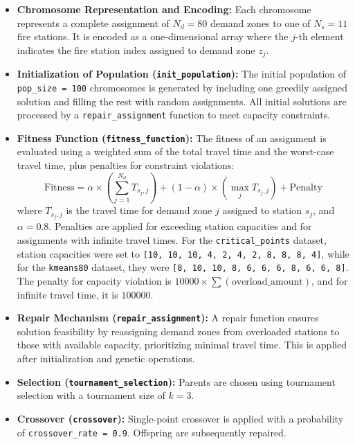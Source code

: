 \documentclass[conference]{IEEEtran}
\begin{document}
\begin{itemize}
    \item \textbf{Chromosome Representation and Encoding:} Each chromosome represents a complete assignment of $N_d=80$ demand zones to one of $N_s=11$ fire stations. It is encoded as a one-dimensional array where the $j$-th element indicates the fire station index assigned to demand zone $z_j$.

    \item \textbf{Initialization of Population (\texttt{init\_population}):} The initial population of \texttt{pop\_size = 100} chromosomes is generated by including one greedily assigned solution and filling the rest with random assignments. All initial solutions are processed by a \texttt{repair\_assignment} function to meet capacity constraints.

    \item \textbf{Fitness Function (\texttt{fitness\_function}):} The fitness of an assignment is evaluated using a weighted sum of the total travel time and the worst-case travel time, plus penalties for constraint violations:
    \[ \text{Fitness} = \alpha \times \left(\sum_{j=1}^{N_d} T_{s_j, j}\right) + (1 - \alpha) \times \left(\max_{j} T_{s_j, j}\right) + \text{Penalty} \]
    where $T_{s_j, j}$ is the travel time for demand zone $j$ assigned to station $s_j$, and $\alpha = 0.8$. Penalties are applied for exceeding station capacities and for assignments with infinite travel times. For the \texttt{critical\_points} dataset, station capacities were set to \texttt{[10, 10, 10, 4, 2, 4, 2, 8, 8, 8, 4]}, while for the \texttt{kmeans80} dataset, they were \texttt{[8, 10, 10, 8, 6, 6, 6, 8, 6, 6, 8]}. The penalty for capacity violation is $10000 \times \sum (\text{overload\_amount})$, and for infinite travel time, it is $100000$.

    \item \textbf{Repair Mechanism (\texttt{repair\_assignment}):} A repair function ensures solution feasibility by reassigning demand zones from overloaded stations to those with available capacity, prioritizing minimal travel time. This is applied after initialization and genetic operations.

    \item \textbf{Selection (\texttt{tournament\_selection}):} Parents are chosen using tournament selection with a tournament size of $k=3$.

    \item \textbf{Crossover (\texttt{crossover}):} Single-point crossover is applied with a probability of \texttt{crossover\_rate = 0.9}. Offspring are subsequently repaired.


\end{itemize}
\end{document}
